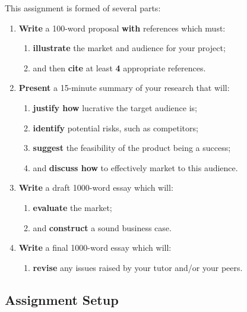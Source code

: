 \documentclass{../fal_assignment}
\newcommand{\proposalWordCount}{100}
\newcommand{\essayWordCount}{1000}
\newcommand{\presentationMinutes}{15}
\newcommand{\minReferenceCount}{4 }
\begin{document}
This assignment is formed of several parts:

\begin{enumerate}[label=(\Alph*)]
    \item \textbf{Write} a \proposalWordCount-word proposal \textbf{with} references which must:
    	\begin{enumerate}[label=\roman*.]
    		\item \textbf{illustrate} the market and audience for your project;
    		\item and then \textbf{cite} at least \textbf{\minReferenceCount} appropriate references.
	\end{enumerate}
    \item \textbf{Present} a \presentationMinutes-minute summary of your research that will:
    	\begin{enumerate}[label=\roman*.]
    		\item \textbf{justify how} lucrative the target audience is;
    		\item \textbf{identify} potential risks, such as competitors;
    		\item \textbf{suggest} the feasibility of the product being a success;
    		\item and \textbf{discuss how} to effectively market to this audience.
	\end{enumerate}
    \item \textbf{Write} a draft \essayWordCount-word essay which will:
    	\begin{enumerate}[label=\roman*.]
    		\item  \textbf{evaluate} the market;
    		\item  and \textbf{construct} a sound business case.
	\end{enumerate}
    \item \textbf{Write} a final \essayWordCount-word essay which will:
    	\begin{enumerate}[label=\roman*.]
    		\item \textbf{revise} any issues raised by your tutor and/or your peers.
	\end{enumerate}
\end{enumerate}


\subsection*{Assignment Setup}
\end{document}
